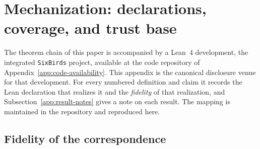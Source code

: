 \section{Mechanization: declarations, coverage, and trust base}\label{app:mechanization}

The theorem chain of this paper is accompanied by a Lean~4 development, the
integrated \texttt{SixBirds} project, available at the code repository of
Appendix~\ref{app:code-availability}. This appendix is the canonical disclosure
venue for that development. For every numbered definition and claim it records
the Lean declaration that realizes it and the \emph{fidelity} of that
realization, and Subsection~\ref{app:result-notes} gives a note on each result.
The mapping is maintained in the repository and reproduced here.

\subsection{Fidelity of the correspondence}\label{app:fidelity-legend}

